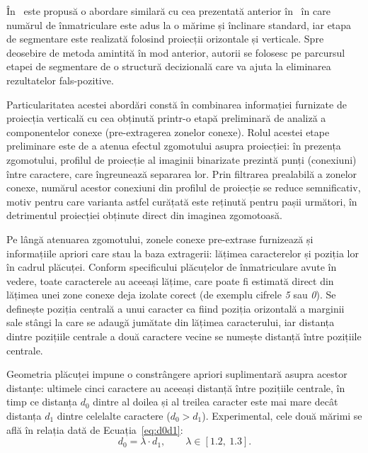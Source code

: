 În~\cite{sanyuan2004car} este propusă o abordare similară cu cea prezentată anterior în~\cite{HoughTransformation} în care numărul de înmatriculare este adus la o mărime și înclinare standard, iar etapa de segmentare este realizată folosind proiecții orizontale și verticale. Spre deosebire de metoda amintită în mod anterior, autorii se folosesc pe parcursul etapei de segmentare de o structură decizională care va ajuta la eliminarea rezultatelor fals-pozitive.

Particularitatea acestei abordări constă în combinarea informației furnizate de proiecția verticală cu cea obținută printr-o etapă preliminară de analiză a componentelor conexe (pre-extragerea zonelor conexe). Rolul acestei etape preliminare este de a atenua efectul zgomotului asupra proiecției: în prezența zgomotului, profilul de proiecție al imaginii binarizate prezintă punți (conexiuni) între caractere, care îngreunează separarea lor. Prin filtrarea prealabilă a zonelor conexe, numărul acestor conexiuni din profilul de proiecție se reduce semnificativ, motiv pentru care varianta astfel curățată este reținută pentru pașii următori, în detrimentul proiecției obținute direct din imaginea zgomotoasă.

Pe lângă atenuarea zgomotului, zonele conexe pre-extrase furnizează și informațiile apriori care stau la baza extragerii: lățimea caracterelor și poziția lor în cadrul plăcuței. Conform specificului plăcuțelor de înmatriculare avute în vedere, toate caracterele au aceeași lățime, care poate fi estimată direct din lățimea unei zone conexe deja izolate corect (de exemplu cifrele \textit{5} sau \textit{0}). Se definește poziția centrală a unui caracter ca fiind poziția orizontală a marginii sale stângi la care se adaugă jumătate din lățimea caracterului, iar distanța dintre pozițiile centrale a două caractere vecine se numește distanță între pozițiile centrale.

Geometria plăcuței impune o constrângere apriori suplimentară asupra acestor distanțe: ultimele cinci caractere au aceeași distanță între pozițiile centrale, în timp ce distanța $d_0$ dintre al doilea și al treilea caracter este mai mare decât distanța $d_1$ dintre celelalte caractere ($d_0 > d_1$). Experimental, cele două mărimi se află în relația dată de Ecuația~\ref{eq:d0d1}:
\begin{equation}
        d_0 = \lambda \cdot d_1, \qquad \lambda \in [1.2,\ 1.3].
        \label{eq:d0d1}
\end{equation}

